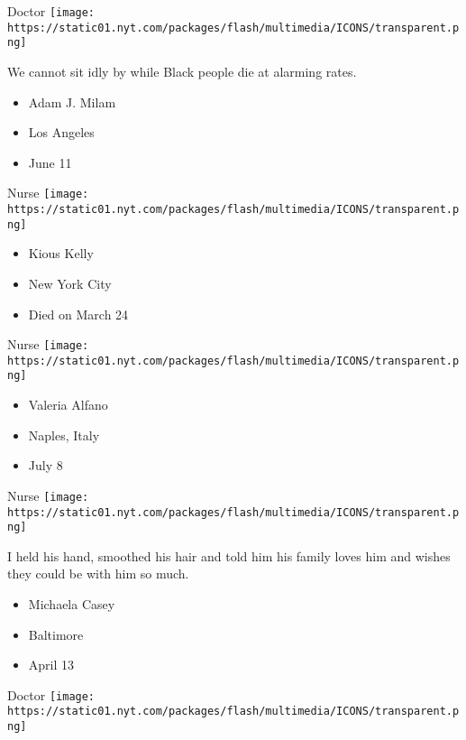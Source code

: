 \protect\hyperlink{item-adam-j-milam}{}

Doctor
\texttt{[image: https://static01.nyt.com/packages/flash/multimedia/ICONS/transparent.png]}

We cannot sit idly by while Black people die at alarming rates.

\begin{itemize}
\tightlist
\item
  Adam J. Milam
\item
  Los Angeles
\item
  June 11
\end{itemize}

\protect\hyperlink{item-kious-kelly}{}

Nurse
\texttt{[image: https://static01.nyt.com/packages/flash/multimedia/ICONS/transparent.png]}

\begin{itemize}
\tightlist
\item
  Kious Kelly
\item
  New York City
\item
  Died on March 24
\end{itemize}

\protect\hyperlink{item-valeria-alfano}{}

Nurse
\texttt{[image: https://static01.nyt.com/packages/flash/multimedia/ICONS/transparent.png]}

\begin{itemize}
\tightlist
\item
  Valeria Alfano
\item
  Naples, Italy
\item
  July 8
\end{itemize}

\protect\hyperlink{item-michaela-casey}{}

Nurse
\texttt{[image: https://static01.nyt.com/packages/flash/multimedia/ICONS/transparent.png]}

I held his hand, smoothed his hair and told him his family loves him and
wishes they could be with him so much.

\begin{itemize}
\tightlist
\item
  Michaela Casey
\item
  Baltimore
\item
  April 13
\end{itemize}

\protect\hyperlink{item-ousseni-w-tiemtore}{}

Doctor
\texttt{[image: https://static01.nyt.com/packages/flash/multimedia/ICONS/transparent.png]}

